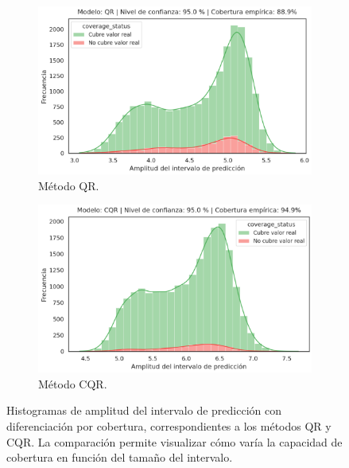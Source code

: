 \begin{figure}[h]
    \centering

    \begin{subfigure}[b]{0.75\textwidth}
        \centering
        \includegraphics[width=\textwidth]{capitulos/cap_05/imagenes/AE_histogram_EC_by_PIW_QR.png}
        \caption[
            Histograma de amplitud del intervalo de predicción con diferenciación por cobertura (método QR).
        ]{
            Método QR.
        }
        \label{fig:AE_EC_by_PIW_QR}
    \end{subfigure}

    \vspace{0.5cm}
    
    \begin{subfigure}[b]{0.75\textwidth}
        \centering
        \includegraphics[width=\textwidth]{capitulos/cap_05/imagenes/AE_histogram_EC_by_PIW_CQR.png}
        \caption[
            Histograma de amplitud del intervalo de predicción con diferenciación por cobertura (método CQR).
        ]{
            Método CQR.
        }
        \label{fig:AE_EC_by_PIW_CQR}
    \end{subfigure}

    \caption[
        Problema de estimación de edad: 
        Histogramas del amplitud del intervalo de predicción con diferenciación por cobertura, correspondientes a los métodos QR y CQR.
    ]{
        Histogramas de amplitud del intervalo de predicción con diferenciación por cobertura, correspondientes a los métodos QR y CQR.
        La comparación permite visualizar cómo varía la capacidad de cobertura en función del tamaño del intervalo.
    }
    \label{fig:AE_EC_by_PIW}
\end{figure}

